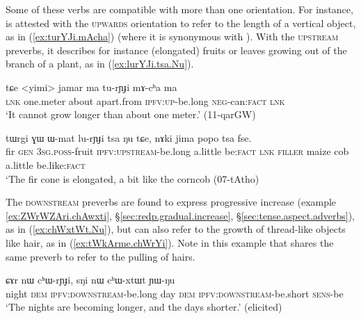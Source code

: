 Some of these verbs are compatible with more than one orientation. For instance,  is attested with the \textsc{upwards} orientation to refer to the length of a vertical object, as in (\ref{ex:turYJi.mAcha}) (where it is synonymous with ). With the \textsc{upstream} preverbs, it describes for instance (elongated) fruits or leaves growing out of the branch of a plant, as in (\ref{ex:lurYJi.tsa.Nu}).
 
\begin{exe}
\ex \label{ex:turYJi.mAcha}
\gll tɕe <yimi> jamar ma tu-rɲɟi mɤ-cʰa ma  \\
\textsc{lnk} one.meter about apart.from \textsc{ipfv}:\textsc{up}-be.long \textsc{neg}-can:\textsc{fact} \textsc{lnk} \\
\glt `It cannot grow longer than about one meter.' (11-qarGW)
\end{exe}

\begin{exe}
\ex \label{ex:lurYJi.tsa.Nu}
\gll tɯrgi ɣɯ ɯ-mat lu-rɲɟi tsa ŋu tɕe, nɤki jima popo tsa fse. \\
fir \textsc{gen}  \textsc{3sg}.\textsc{poss}-fruit \textsc{ipfv}:\textsc{upstream}-be.long a.little be:\textsc{fact} \textsc{lnk} \textsc{filler} maize cob a.little be.like:\textsc{fact} \\
\glt  `The fir cone is elongated, a bit like the corncob (07-tAtho)
\end{exe}

The \textsc{downstream} preverbs are found to express progressive increase (example \ref{ex:ZWrWZAri.chAwxti}, §\ref{sec:redp.gradual.increase}, §\ref{sec:tense.aspect.adverbs}), as in (\ref{ex:chWxtWt.Nu}), but can also refer to the growth of thread-like objects like hair, as in (\ref{ex:tWkArme.chWrYi}). Note in this example that  shares the same preverb to refer to the pulling of hairs.
 
\begin{exe}
\ex \label{ex:chWxtWt.Nu}
\gll ɕɤr nɯ cʰɯ-rɲɟi, sŋi nɯ cʰɯ-xtɯt ɲɯ-ŋu \\
night \textsc{dem} \textsc{ipfv}:\textsc{downstream}-be.long day \textsc{dem}  \textsc{ipfv}:\textsc{downstream}-be.short \textsc{sens}-be \\
\glt `The nights are becoming longer, and the days shorter.' (elicited)
\end{exe}

